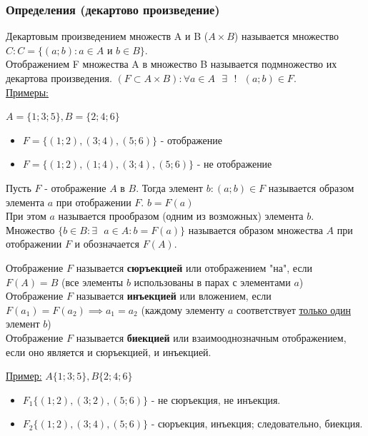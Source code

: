 \documentclass[12pt]{article}
\begin{document}
    \subsubsection*{Определения (декартово произведение)}
    \noindent Декартовым произведением множеств A и B ($A \times B$) называется множество $C : C = \{ (a; b) : a \in A \text{ и } b \in B\}$.\\
    Отображением F множества A в множество B называется подмножество их декартова произведения. $(F \subset A \times B) : \forall a \in A \text{ } \exists \text{ } ! \text{ } (a;b) \in F$.\\
    \underline{Примеры:}\par
    $A = \{1; 3; 5\}, B = \{2; 4; 6\}$
    \begin{itemize}
        \item $F = \{(1;2), (3;4), (5;6)\}$ - отображение
        \item $F = \{(1;2), (1;4), (3;4), (5;6)\}$ - не отображение
    \end{itemize}
    Пусть $F$ - отображение $A$ в $B$. Тогда элемент $b : (a;b) \in F$ называется образом элемента $a$ при отображении $F$. $b = F(a)$\\
    При этом $a$ называется прообразом (одним из возможных) элемента $b$.\\
    Множество $\{b \in B : \exists \text{ } a \in A : b = F(a)\}$ называется образом множества $A$ при отображении $F$ и обозначается $F(A)$.\par
    \noindent Отображение $F$ называется \textbf{сюръекцией} или отображением "на", если $F(A) = B$ (все элементы $b$ использованы в парах с элементами $a$)\\
    Отображение $F$ называется \textbf{инъекцией} или вложением, если $F(a_{1}) = F(a_{2}) \implies a_{1} = a_{2}$ (каждому элементу $a$ соответствует \underline{только один} элемент $b$)\\
    Отображение $F$ называется \textbf{биекцией} или взаимооднозначным отображением, если оно является и сюръекцией, и инъекцией.\par
    \noindent \underline{Пример:}  $A\{1;3;5\}, B\{2;4;6\}$
    \begin{itemize}
        \item $F_{1}\{(1;2),(3;2),(5;6)\}$ - не сюръекция, не инъекция.
        \item $F_{2}\{(1;2),(3;4),(5;6)\}$ - сюръекция, инъекция; следовательно, биекция.
    \end{itemize}
\end{document}
